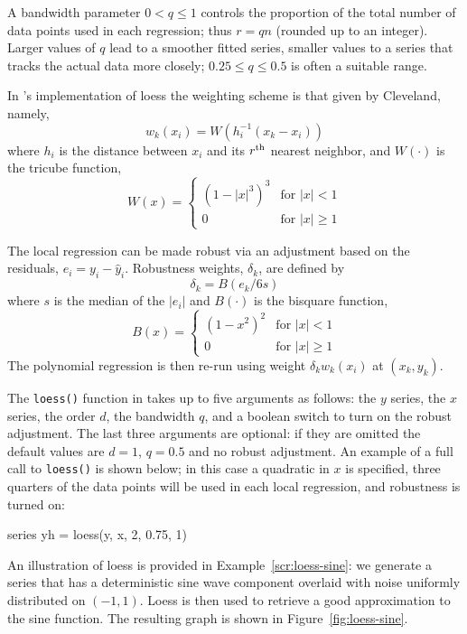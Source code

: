 A bandwidth parameter $0 < q \leq 1$ controls the proportion of the
total number of data points used in each regression; thus $r = qn$
(rounded up to an integer). Larger values of $q$ lead to a smoother
fitted series, smaller values to a series that tracks the actual data
more closely; $0.25 \leq q \leq 0.5$ is often a suitable range.

In 's implementation of loess the weighting scheme is
that given by Cleveland, namely,
\[
w_k(x_i) = W(h_i^{-1}(x_k - x_i))
\]
where $h_i$ is the distance between $x_i$ and its $r^{\rm th}$ nearest
neighbor, and $W(\cdot)$ is the tricube function,
\[
W(x) = \begin{cases}
 (1 - |x|^3)^3 & \mbox{for } |x| < 1 \\
  0            & \mbox{for } |x| \geq 1
\end{cases}
\]

The local regression can be made robust via an adjustment based on the
residuals, $e_i = y_i - \hat{y}_i$. Robustness weights, $\delta_k$, are
defined by
\[
\delta_k = B(e_k / 6s)
\]
where $s$ is the median of the $|e_i|$ and $B(\cdot)$ is the
bisquare function,
\[
B(x) = \begin{cases}
 (1 - x^2)^2 & \mbox{for } |x| < 1 \\
  0          & \mbox{for } |x| \geq 1
\end{cases}
\]
The polynomial regression is then re-run using weight
$\delta_kw_k(x_i)$ at $(x_k, y_k)$.

The \texttt{loess()} function in  takes up to five
arguments as follows: the $y$ series, the $x$ series, the order $d$,
the bandwidth $q$, and a boolean switch to turn on the robust
adjustment. The last three arguments are optional: if they are omitted
the default values are $d=1$, $q=0.5$ and no robust adjustment. An
example of a full call to \texttt{loess()} is shown below; in this
case a quadratic in $x$ is specified, three quarters of the data
points will be used in each local regression, and robustness is turned
on:
\begin{code}
series yh = loess(y, x, 2, 0.75, 1)
\end{code}

An illustration of loess is provided in Example~\ref{scr:loess-sine}:
we generate a series that has a deterministic sine wave component
overlaid with noise uniformly distributed on $(-1,1)$. Loess is then
used to retrieve a good approximation to the sine function.  The
resulting graph is shown in Figure~\ref{fig:loess-sine}.

